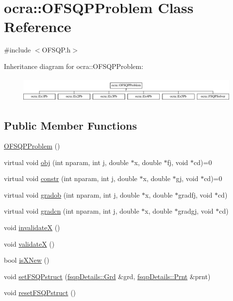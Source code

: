 \hypertarget{classocra_1_1OFSQPProblem}{}\section{ocra\+:\+:O\+F\+S\+Q\+P\+Problem Class Reference}
\label{classocra_1_1OFSQPProblem}


{\ttfamily \#include $<$O\+F\+S\+Q\+P.\+h$>$}

Inheritance diagram for ocra\+:\+:O\+F\+S\+Q\+P\+Problem\+:\begin{figure}[H]
\begin{center}
\leavevmode
\includegraphics[height=1.314554cm]{d5/d0c/classocra_1_1OFSQPProblem}
\end{center}
\end{figure}
\subsection*{Public Member Functions}
\begin{DoxyCompactItemize}
\item 
\hyperlink{classocra_1_1OFSQPProblem_affaeb6cbf6326ef2e9dab6b7ee8c80f6}{O\+F\+S\+Q\+P\+Problem} ()
\item 
virtual void \hyperlink{classocra_1_1OFSQPProblem_adca0c224eb1b9f6e0c2d17f07277a899}{obj} (int nparam, int j, double $\ast$x, double $\ast$fj, void $\ast$cd)=0
\item 
virtual void \hyperlink{classocra_1_1OFSQPProblem_a2049a97008ac6eaa306c3cb05ef7d394}{constr} (int nparam, int j, double $\ast$x, double $\ast$gj, void $\ast$cd)=0
\item 
virtual void \hyperlink{classocra_1_1OFSQPProblem_a1300d237d9b87df1f71db7129c38458a}{gradob} (int nparam, int j, double $\ast$x, double $\ast$gradfj, void $\ast$cd)
\item 
virtual void \hyperlink{classocra_1_1OFSQPProblem_ab89eefbaf9b86a89a0ceede0b4b61284}{gradcn} (int nparam, int j, double $\ast$x, double $\ast$gradgj, void $\ast$cd)
\item 
void \hyperlink{classocra_1_1OFSQPProblem_a65096824ee00c0254cfeee877dba0141}{invalidateX} ()
\item 
void \hyperlink{classocra_1_1OFSQPProblem_a4877a5ab95e85c32c32eca22d2db1147}{validateX} ()
\item 
bool \hyperlink{classocra_1_1OFSQPProblem_a3c43fbd5d2ef3aeb9c6d936c83d34464}{is\+X\+New} ()
\item 
void \hyperlink{classocra_1_1OFSQPProblem_ae57b5fa2934e2ae619e748079335d3b7}{set\+F\+S\+Q\+Pstruct} (\hyperlink{structocra_1_1fsqpDetails_1_1Grd}{fsqp\+Details\+::\+Grd} \&grd, \hyperlink{structocra_1_1fsqpDetails_1_1Prnt}{fsqp\+Details\+::\+Prnt} \&prnt)
\item 
void \hyperlink{classocra_1_1OFSQPProblem_a774f1a1e9d5014ea878b8de4750c3a13}{reset\+F\+S\+Q\+Pstruct} ()
\end{DoxyCompactItemize}


